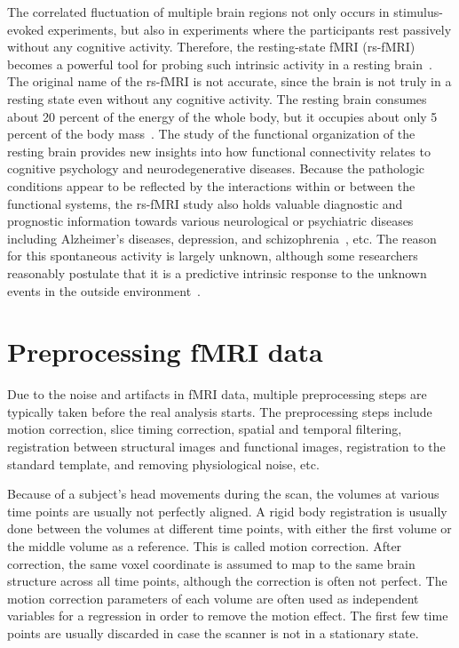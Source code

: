 The correlated fluctuation of multiple brain regions not only occurs in
stimulus-evoked experiments, but also in experiments where the participants rest
passively without any cognitive activity. Therefore, the resting-state fMRI
(rs-fMRI) becomes a powerful tool for probing such intrinsic activity in a
resting brain~\cite{raichle2001, fox2007spontaneous}. The original name of the
rs-fMRI is not accurate, since the brain is not truly in a resting state even
without any cognitive activity. The resting brain consumes about 20 percent of
the energy of the whole body, but it occupies about only 5 percent of the body
mass~\cite{fox2005human}. The study of the functional organization of the
resting brain provides new insights into how functional connectivity relates to
cognitive psychology and neurodegenerative diseases.  Because the pathologic
conditions appear to be reflected by the interactions within or between the
functional systems, the rs-fMRI study also holds valuable diagnostic and
prognostic information towards various neurological or psychiatric diseases
including Alzheimer's diseases, depression, and
schizophrenia~\cite{fox2007spontaneous, greicius2007resting,
  greicius2003functional}, etc. The reason for this spontaneous activity is
largely unknown, although some researchers reasonably postulate that it is a
predictive intrinsic response to the unknown events in the outside
environment~\cite{deco2010emerging}.

\section{Preprocessing fMRI data}
Due to the noise and artifacts in fMRI data, multiple preprocessing steps are
typically taken before the real analysis starts. The preprocessing steps include
motion correction, slice timing correction, spatial and temporal filtering,
registration between structural images and functional images, registration
to the standard template, and removing physiological noise, etc.

Because of a subject's head movements during the scan, the volumes at various
time points are usually not perfectly aligned. A rigid body registration is
usually done between the volumes at different time points, with either the first
volume or the middle volume as a reference. This is called motion
correction. After correction, the same voxel coordinate is assumed to map to the
same brain structure across all time points, although the correction is often
not perfect. The motion correction parameters of each volume are often used as
independent variables for a regression in order to remove the motion effect. The
first few time points are usually discarded in case the scanner is not in a
stationary state.


